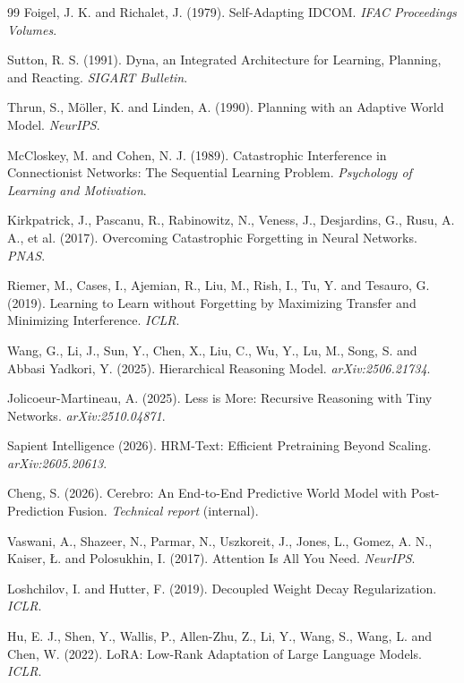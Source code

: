 \begin{thebibliography}{99}
Foigel, J. K. and Richalet, J. (1979). Self-Adapting IDCOM. \textit{IFAC Proceedings Volumes}.

Sutton, R. S. (1991). Dyna, an Integrated Architecture for Learning, Planning, and Reacting.
\textit{SIGART Bulletin}.

Thrun, S., M\"oller, K. and Linden, A. (1990). Planning with an Adaptive World Model.
\textit{NeurIPS}.

McCloskey, M. and Cohen, N. J. (1989). Catastrophic Interference in Connectionist Networks:
The Sequential Learning Problem. \textit{Psychology of Learning and Motivation}.

Kirkpatrick, J., Pascanu, R., Rabinowitz, N., Veness, J., Desjardins, G., Rusu, A. A., et al.
(2017). Overcoming Catastrophic Forgetting in Neural Networks. \textit{PNAS}.

Riemer, M., Cases, I., Ajemian, R., Liu, M., Rish, I., Tu, Y. and Tesauro, G. (2019). Learning
to Learn without Forgetting by Maximizing Transfer and Minimizing Interference.
\textit{ICLR}.

Wang, G., Li, J., Sun, Y., Chen, X., Liu, C., Wu, Y., Lu, M., Song, S. and Abbasi Yadkori, Y.
(2025). Hierarchical Reasoning Model. \textit{arXiv:2506.21734}.

Jolicoeur-Martineau, A. (2025). Less is More: Recursive Reasoning with Tiny Networks.
\textit{arXiv:2510.04871}.

Sapient Intelligence (2026). HRM-Text: Efficient Pretraining Beyond Scaling.
\textit{arXiv:2605.20613}.

Cheng, S. (2026). Cerebro: An End-to-End Predictive World Model with Post-Prediction Fusion.
\textit{Technical report} (internal).

Vaswani, A., Shazeer, N., Parmar, N., Uszkoreit, J., Jones, L., Gomez, A. N., Kaiser, {\L}. and
Polosukhin, I. (2017). Attention Is All You Need. \textit{NeurIPS}.

Loshchilov, I. and Hutter, F. (2019). Decoupled Weight Decay Regularization. \textit{ICLR}.

Hu, E. J., Shen, Y., Wallis, P., Allen-Zhu, Z., Li, Y., Wang, S., Wang, L. and Chen, W.
(2022). LoRA: Low-Rank Adaptation of Large Language Models. \textit{ICLR}.

\end{thebibliography}
